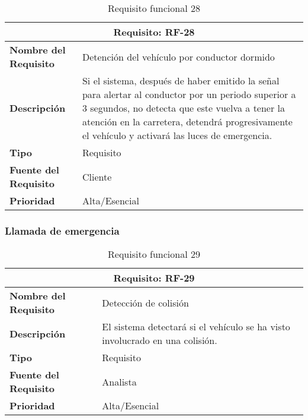 \begin{table}[H]
\begin{center}
\begin{tabular}{p{} p{7cm}}
\multicolumn{2}{c}{\textbf{Requisito: RF-28} } \\
\hline \hline
\textbf{Nombre del Requisito} & Detención del vehículo por conductor dormido\\
\hline
\textbf{Descripción} & Si el sistema, después de haber emitido la señal para alertar al conductor por un periodo superior a 3 segundos, no detecta que este vuelva a tener la atención en la carretera, detendrá progresivamente el vehículo y activará las luces de emergencia.\\
\hline
\textbf{Tipo} & Requisito  \\
\hline
\textbf{Fuente del Requisito} & Cliente  \\
\hline
\textbf{Prioridad} & Alta/Esencial  \\ \hline
\end{tabular}
\caption{Requisito funcional 28}
\label{tab:RF-28}
\end{center}
\end{table}



\subsubsection{Llamada de emergencia}

\begin{table}[H]
\begin{center}
\begin{tabular}{p{} p{7cm}}
\multicolumn{2}{c}{\textbf{Requisito: RF-29} } \\
\hline \hline
\textbf{Nombre del Requisito} & Detección de colisión\\
\hline
\textbf{Descripción} &El sistema detectará si el vehículo se ha visto involucrado en una colisión.\\
\hline
\textbf{Tipo} & Requisito  \\
\hline
\textbf{Fuente del Requisito} & Analista  \\
\hline
\textbf{Prioridad} & Alta/Esencial  \\ \hline
\end{tabular}
\caption{Requisito funcional 29}
\label{tab:RF-29}
\end{center}
\end{table}

